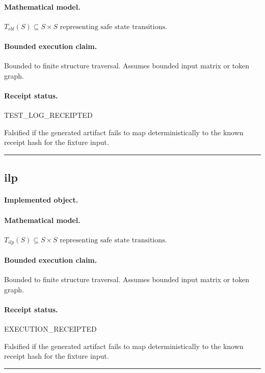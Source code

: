 \paragraph{Mathematical model.} $T_{ebl}(S) \subseteq S \times S \text{ representing safe state transitions}.$
\paragraph{Bounded execution claim.} Bounded to finite structure traversal. Assumes bounded input matrix or token graph.
\paragraph{Receipt status.} TEST\_LOG\_RECEIPTED
\begin{falsifier}
Falsified if the generated artifact fails to map deterministically to the known receipt hash for the fixture input.
\end{falsifier}

\vspace{1em}\hrule\vspace{1em}
\subsection{ilp}
\paragraph{Implemented object.} 
\paragraph{Mathematical model.} $T_{ilp}(S) \subseteq S \times S \text{ representing safe state transitions}.$
\paragraph{Bounded execution claim.} Bounded to finite structure traversal. Assumes bounded input matrix or token graph.
\paragraph{Receipt status.} EXECUTION\_RECEIPTED
\begin{falsifier}
Falsified if the generated artifact fails to map deterministically to the known receipt hash for the fixture input.
\end{falsifier}

\vspace{1em}\hrule\vspace{1em}

